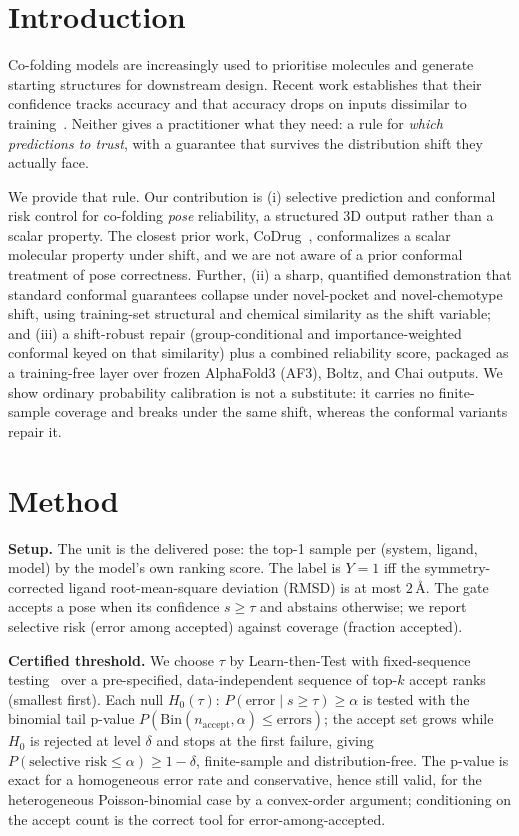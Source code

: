 \documentclass[10pt]{article}
\begin{document}
\section{Introduction}
Co-folding models are increasingly used to prioritise molecules and generate starting structures for
downstream design. Recent work establishes that their confidence tracks accuracy and that accuracy
drops on inputs dissimilar to training~\citep{rnp}. Neither gives a practitioner what they need: a
rule for \emph{which predictions to trust}, with a guarantee that survives the distribution shift
they actually face.

We provide that rule. Our contribution is (i) selective prediction and conformal risk control for
co-folding \emph{pose} reliability, a structured 3D output rather than a scalar property. The closest
prior work, CoDrug~\citep{codrug}, conformalizes a scalar molecular property under shift, and we are
not aware of a prior conformal treatment of pose correctness. Further, (ii) a sharp, quantified
demonstration that standard conformal guarantees collapse under novel-pocket and novel-chemotype
shift, using training-set structural and chemical similarity as the shift variable; and (iii) a
shift-robust repair (group-conditional and importance-weighted conformal keyed on that similarity)
plus a combined reliability score, packaged as a training-free layer over frozen AlphaFold3 (AF3),
Boltz, and Chai outputs. We show ordinary probability calibration is not a substitute: it carries no
finite-sample coverage and breaks under the same shift, whereas the conformal variants repair it.

\section{Method}
\textbf{Setup.} The unit is the delivered pose: the top-1 sample per (system, ligand, model) by the
model's own ranking score. The label is $Y=1$ iff the symmetry-corrected ligand root-mean-square
deviation (RMSD) is at most $2$\,\AA. The gate accepts a pose when its confidence $s\ge\tau$ and
abstains otherwise; we report selective risk (error among accepted) against coverage (fraction
accepted).

\textbf{Certified threshold.} We choose $\tau$ by Learn-then-Test with fixed-sequence
testing~\citep{angelopoulos2021ltt} over a pre-specified, data-independent sequence of top-$k$ accept
ranks (smallest first). Each null $H_0(\tau)\!:\,P(\text{error}\mid s\ge\tau)\ge\alpha$ is tested with
the binomial tail p-value $P(\mathrm{Bin}(n_{\text{accept}},\alpha)\le\text{errors})$; the accept set
grows while $H_0$ is rejected at level $\delta$ and stops at the first failure, giving
$P(\text{selective risk}\le\alpha)\ge 1-\delta$, finite-sample and distribution-free. The p-value is
exact for a homogeneous error rate and conservative, hence still valid, for the heterogeneous
Poisson-binomial case by a convex-order argument; conditioning on the accept count is the correct tool
for error-among-accepted.
\end{document}
